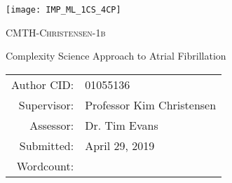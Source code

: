 \texttt{[image: IMP\_ML\_1CS\_4CP]}	
\vspace*{8cm}

\begin{centering}

	{\Huge \scshape CMTH-Christensen-1b}
	\vspace*{1cm}

	{\Huge Complexity Science Approach to Atrial Fibrillation}
	\vspace*{6cm}
	
	{\Large
	\begin{tabular}{rl}
		{\Large Author CID:} & {01055136} \vspace*{0.1cm} \\
		{\Large Supervisor:} & Professor Kim Christensen \vspace*{0.1cm} \\
		{\Large Assessor:} & Dr. Tim Evans \vspace*{0.1cm} \\
		{\Large Submitted:} & April 29, 2019 \vspace*{0.1cm} \\ %
		{\Large Wordcount:} & \texcount{\projectfilename} \vspace*{0.1cm} \\
	\end{tabular}
	}

\end{centering}
